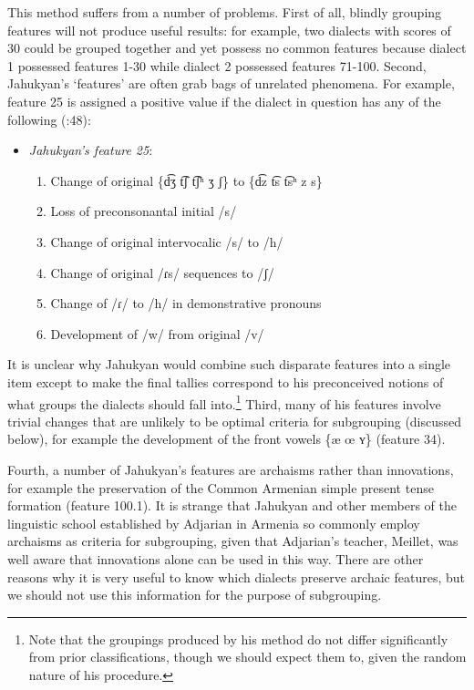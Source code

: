 \documentclass[output=paper]{langscibook}
\begin{document}
This method suffers from a number of problems. First of all, blindly grouping features will not produce useful results: for example, two dialects with scores of 30 could be grouped together and yet possess no common features because dialect 1 possessed features 1-30 while dialect 2 possessed features 71-100. Second, Jahukyan's `features' are often grab bags of unrelated phenomena. For example, feature 25 is assigned a positive value if the dialect in question has any of the following (\citeyear{Jahukyan-1972-ArmenianDiaolectology}:48):

 
\begin{itemize} 
\item \textit{Jahukyan's feature 25}:
\begin{enumerate}
\item  	Change of original \{d͡ʒ t͡ʃ t͡ʃʰ ʒ ʃ\} to  \{d͡z t͡s t͡sʰ z s\} 
\item  Loss of preconsonantal initial /s/
\item  	Change of original intervocalic /s/ to /h/
\item  Change of original /ɾs/ sequences to /ʃ/
\item  	Change of /ɾ/ to /h/ in demonstrative pronouns
\item  	Development of /w/ from original /v/
\end{enumerate}

\end{itemize}

It is unclear why Jahukyan would combine such disparate features into a single item except to make the final tallies correspond to his preconceived notions of what groups the dialects should fall into.\footnote{Note that the groupings produced by his method do not differ significantly from prior classifications, though we should expect them to, given the random nature of his procedure.}  Third, many of his features involve trivial changes that are unlikely to be optimal criteria for subgrouping (discussed below), for example the development of the front vowels \{æ œ ʏ\} (feature 34). 

Fourth, a number of Jahukyan's features are archaisms rather than innovations, for example the preservation of the Common Armenian simple present tense formation (feature 100.1). It is strange that Jahukyan and other members of the linguistic school established by Adjarian in Armenia so commonly employ archaisms as criteria for subgrouping, given that Adjarian's teacher, Meillet, was well aware that innovations alone can be used in this way. There are other reasons why it is very useful to know which dialects preserve archaic features, but we should not use this information for the purpose of subgrouping. 
\end{document}
